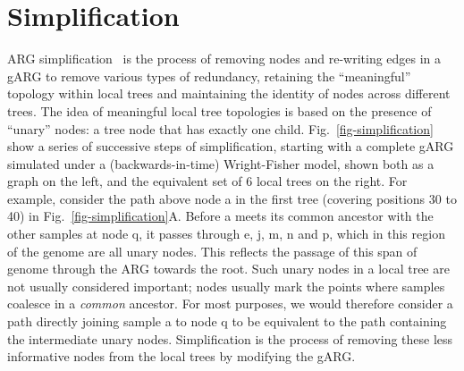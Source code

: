 \documentclass{article}
\begin{document}

\section*{Simplification}\label{ARG_simplification}
ARG simplification~\citep{kelleher2018efficient} is the process
of removing nodes and re-writing edges in a gARG to remove
various types of redundancy,
retaining the ``meaningful'' topology within local trees
and maintaining the identity of nodes across different trees.
The idea of meaningful local tree topologies is based on the
presence of ``unary'' nodes: a tree node that has exactly
one child. Fig.~\ref{fig-simplification} show a series of successive steps of
simplification, starting with a complete gARG simulated under a
(backwards-in-time) Wright-Fisher
model, shown both as a graph on the left, and the equivalent set of 6
local trees on the right.
For example, consider the path above node
\textsf{a} in the first tree (covering positions 30 to 40)
in Fig.~\ref{fig-simplification}A.
Before \textsf{a} meets its common ancestor with the other samples at
node \textsf{q}, it passes through \textsf{e}, \textsf{j}, \textsf{m}, \textsf{n} and
\textsf{p}, which in this region of the genome are all unary nodes.
This reflects the passage of this span of genome through the ARG towards the root.
Such unary nodes in a local tree are not usually considered important;
nodes usually mark the points where samples coalesce in a
 \emph{common} ancestor. For most purposes, we would therefore consider a path directly
joining sample \textsf{a} to node \textsf{q} to be equivalent to the path
containing the intermediate unary nodes. Simplification is the process of removing
these less informative nodes from the local trees by modifying the gARG.
\end{document}
